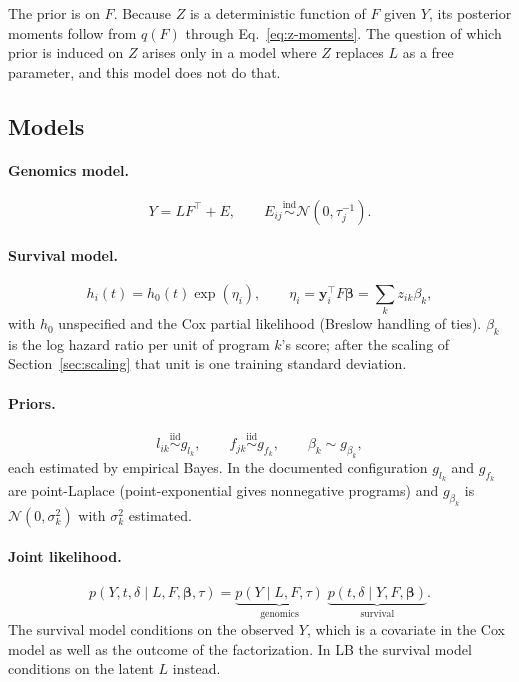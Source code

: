 \documentclass[11pt]{article}
\begin{document}
\begin{keybox}
The prior is on $F$. Because $Z$ is a deterministic function of $F$ given $Y$,
its posterior moments follow from $q(F)$ through Eq.~\eqref{eq:z-moments}. The
question of which prior is induced on $Z$ arises only in a model where $Z$
replaces $L$ as a free parameter, and this model does not do that.
\end{keybox}

\subsection{Models}

\paragraph{Genomics model.}
\begin{equation}\label{eq:genomics}
  Y = LF^\top + E, \qquad E_{ij}\overset{\text{ind}}{\sim}\mathcal{N}(0,\tau_j^{-1}).
\end{equation}

\paragraph{Survival model.}
\begin{equation}\label{eq:survival}
  h_i(t) = h_0(t)\exp(\eta_i), \qquad
  \eta_i = \bm{y}_i^\top F\bm{\beta} = \sum_k z_{ik}\beta_k ,
\end{equation}
with $h_0$ unspecified and the Cox partial likelihood (Breslow handling of ties).
$\beta_k$ is the log hazard ratio per unit of program $k$'s score; after the
scaling of Section~\ref{sec:scaling} that unit is one training standard deviation.

\paragraph{Priors.}
\[
  l_{ik}\overset{\text{iid}}{\sim} g_{l_k}, \qquad
  f_{jk}\overset{\text{iid}}{\sim} g_{f_k}, \qquad
  \beta_k \sim g_{\beta_k},
\]
each estimated by empirical Bayes. In the documented configuration $g_{l_k}$ and
$g_{f_k}$ are point-Laplace (point-exponential gives nonnegative programs) and
$g_{\beta_k}$ is $\mathcal{N}(0,\sigma_k^2)$ with $\sigma_k^2$ estimated.

\paragraph{Joint likelihood.}
\begin{equation}\label{eq:joint}
  p(Y, t, \delta \mid L, F, \bm{\beta}, \tau)
  = \underbrace{p(Y\mid L, F, \tau)}_{\text{genomics}}\;
    \underbrace{p(t,\delta \mid Y, F, \bm{\beta})}_{\text{survival}} .
\end{equation}
The survival model conditions on the observed $Y$, which is a covariate in the
Cox model as well as the outcome of the factorization. In LB the survival model
conditions on the latent $L$ instead.
\end{document}
